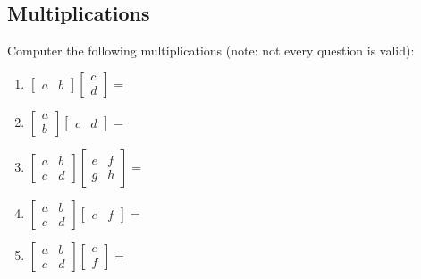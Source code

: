 \documentclass{assignment}
\begin{document}
\begin{problem}
\subsection{Multiplications}
\noindent Computer the following multiplications (note: not every question is valid):
\begin{enumerate}
    \item $\begin{bmatrix}a & b\end{bmatrix} \begin{bmatrix}c \\ d\end{bmatrix} = $
    \item $\begin{bmatrix}a \\ b\end{bmatrix} \begin{bmatrix}c & d\end{bmatrix} = $
    \item $\begin{bmatrix}a & b \\ c & d\end{bmatrix} \begin{bmatrix}e & f \\ g & h\end{bmatrix} = $
    \item $\begin{bmatrix}a & b \\ c & d\end{bmatrix} \begin{bmatrix}e & f\end{bmatrix} = $
    \item $\begin{bmatrix}a & b \\ c & d\end{bmatrix} \begin{bmatrix}e \\ f\end{bmatrix} = $
\end{enumerate}


\end{problem}
\end{document}
